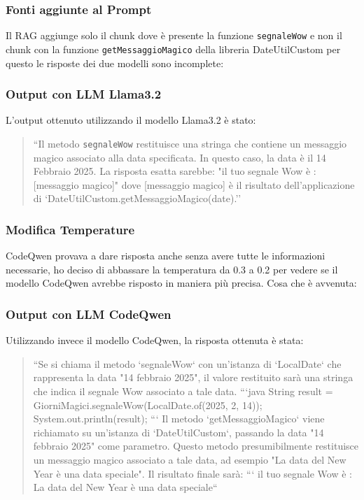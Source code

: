 \documentclass[12pt,a4paper,openright,twoside]{book}
\begin{document}
\subsubsection{Fonti aggiunte al Prompt}
Il RAG aggiunge solo il chunk dove è presente la funzione \texttt{segnaleWow} e non il chunk con la funzione \texttt{getMessaggioMagico} della libreria DateUtilCustom
per questo le risposte dei due modelli sono incomplete:
\subsubsection{Output con LLM Llama3.2}
L'output ottenuto utilizzando il modello Llama3.2 è stato:
\begin{quote}
    ``Il metodo \texttt{segnaleWow} restituisce una stringa che contiene un messaggio magico associato alla data specificata. In questo caso, la data è il 14 Febbraio 2025.
La risposta esatta sarebbe:
"il tuo segnale Wow è : [messaggio magico]"
dove [messaggio magico] è il risultato dell'applicazione di `DateUtilCustom.getMessaggioMagico(date).''
\end{quote}

\subsubsection{Modifica Temperature}
CodeQwen provava a dare risposta anche senza avere tutte le informazioni necessarie, ho deciso di abbassare la temperatura da 0.3 a 0.2 per vedere se il modello CodeQwen avrebbe risposto in maniera più precisa.
Cosa che è avvenuta:

\subsubsection{Output con LLM CodeQwen}
Utilizzando invece il modello CodeQwen, la risposta ottenuta è stata:
\begin{quote}
    ``Se si chiama il metodo `segnaleWow` con un'istanza di `LocalDate` che rappresenta la data "14 febbraio 2025", il valore restituito sarà una stringa che indica il segnale Wow associato a tale data.
    ```java
    String result = GiorniMagici.segnaleWow(LocalDate.of(2025, 2, 14));
    System.out.println(result);
    ```
    Il metodo `getMessaggioMagico` viene richiamato su un'istanza di `DateUtilCustom`, passando la data "14 febbraio 2025" come parametro. Questo metodo presumibilmente restituisce un messaggio magico associato a tale data, ad esempio "La data del New Year è una data speciale".
    Il risultato finale sarà:
    ```
    il tuo segnale Wow è : La data del New Year è una data speciale``
\end{quote}
\end{document}

